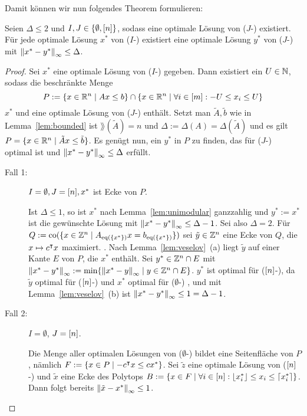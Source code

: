 Damit können wir nun folgendes Theorem formulieren:
\begin{theorem}
		Seien $\Delta\leq 2$ und $I,J\in\{\emptyset,[n]\}$, sodass eine optimale Lösung von ($J$-\MIPI) existiert.
		Für jede optimale Lösung $x^*$ von ($I$-\MIPI) existiert eine optimale Lösung $y^*$ von ($J$-\MIPI) mit $\left\lVert x^*-y^*\right\rVert_\infty\leq \Delta$.
\end{theorem}
\begin{proof}
	Sei $x^*$ eine optimale Lösung von ($I$-\MIPI) gegeben.
	Dann existiert ein $U\in\mathbb{N}$, sodass die beschränkte Menge  $$P:=\{x\in\mathbb{R}^n\mid Ax\leq b\} \cap \{x\in\mathbb{R}^n \mid \forall i\in[m]: -U \leq x_i \leq U \}$$
	$x^*$ und eine optimale Lösung von ($J$-\MIPI) enthält.
	Setzt man $\tilde{A},\tilde{b}$ wie in Lemma~\ref{lem:bounded} ist $\rang(\tilde{A})=n$ und $\Delta:=\Delta(A)=\Delta(\tilde{A})$ und es gilt $P=\{ x\in\mathbb{R}^n \mid \tilde{A}x \leq \tilde{b} \}$.
	Es genügt nun, ein $y^*$ in $P$ zu finden, das für ($J$-\MIPI) optimal ist und $\left\lVert x^* - y^*\right\rVert_\infty\leq\Delta$ erfüllt.
	
	\begin{description}
		\item[Fall 1:]  $I=\emptyset,J=[n], x^*$ ist Ecke von $P$.
		
		Ist $\Delta\leq 1$, so ist $x^*$ nach Lemma~\ref{lem:unimodular} ganzzahlig und $y^* := x^*$ ist die gewünschte Lösung mit $\left\lVert x^*-y^*\right\rVert_\infty\leq \Delta - 1$.
		Sei also $\Delta=2$.
		Für $Q:=\operatorname{co}(\{x\in\mathbb{Z}^n \mid A_{\operatorname{eq}(\{x^*\})}x = b_{\operatorname{eq}({\{x^*\}})} \})$ sei $\tilde{y}\in\mathbb{Z}^n$ eine Ecke von $Q$, die $x\mapsto c^\intercal x$ maximiert. .
		Nach Lemma~\ref{lem:veselov}~(a) liegt $\tilde{y}$ auf einer Kante $E$ von $P$, die $x^*$ enthält.
		Sei $y^*\in\mathbb{Z}^n\cap E$ mit $\left\lVert x^* - y^*\right\rVert_\infty := \min\{ \left\lVert x^*-y\right\rVert_\infty \mid y\in\mathbb{Z}^n\cap E  \}$.
		$y^*$ ist optimal für ($[n]$-\MIPI), da $\tilde{y}$ optimal für ($[n]$-\MIPI) und $x^*$ optimal für ($\emptyset$-\MIPI) , und mit Lemma~\ref{lem:veselov}~(b) ist $\left\lVert x^*-y^*\right\rVert_\infty\leq 1=\Delta-1$.

		\item[Fall 2:] $I=\emptyset$, $J=[n]$.
		
		Die Menge aller optimalen Lösungen von ($\emptyset$-\MIPI) bildet eine Seitenfläche von $P$, nämlich $F:=\{x\in P\mid -c^\intercal x \leq cx^* \}$.
		Sei $\tilde{z}$ eine optimale Lösung von ($[n]$-\MIPI) und $\tilde{x}$ eine Ecke des Polytops $B:=\{ x\in F \mid \forall i \in [n]: \left\lfloor x^*_i \right\rfloor \leq x_i \leq \left\lceil x^*_i \right\rceil \}$.
		Dann folgt bereits $\left\lVert\tilde{x}-x^*\right\rVert_\infty\leq 1$.
		

\end{description}
\end{proof}

